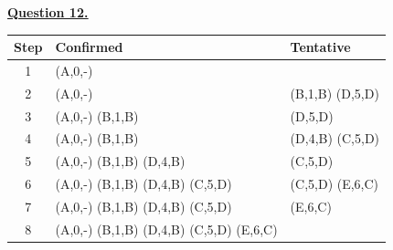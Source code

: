 \documentclass[12pt]{article}
\begin{document}
\hyperlink{toc}{\hypertarget{12}{\LARGE \underline{\textbf{Question 12.}}}}\\
\begin{center}
	\begin{tabular}{|c|l|l|}
		\hline
		Step & Confirmed                               & Tentative       \\\hline
		\hline
		1    & (A,0,-)                                 &                 \\\hline
		2    & (A,0,-)                                 & (B,1,B) (D,5,D) \\\hline
		3    & (A,0,-) (B,1,B)                         & (D,5,D)         \\\hline
		4    & (A,0,-) (B,1,B)                         & (D,4,B) (C,5,D) \\\hline
		5    & (A,0,-) (B,1,B) (D,4,B)                 & (C,5,D)         \\\hline
		6    & (A,0,-) (B,1,B) (D,4,B) (C,5,D)         & (C,5,D) (E,6,C) \\\hline
		7    & (A,0,-) (B,1,B) (D,4,B) (C,5,D)         & (E,6,C)         \\\hline
		8    & (A,0,-) (B,1,B) (D,4,B) (C,5,D) (E,6,C) &                 \\\hline
	\end{tabular}
\end{center}
\end{document}
